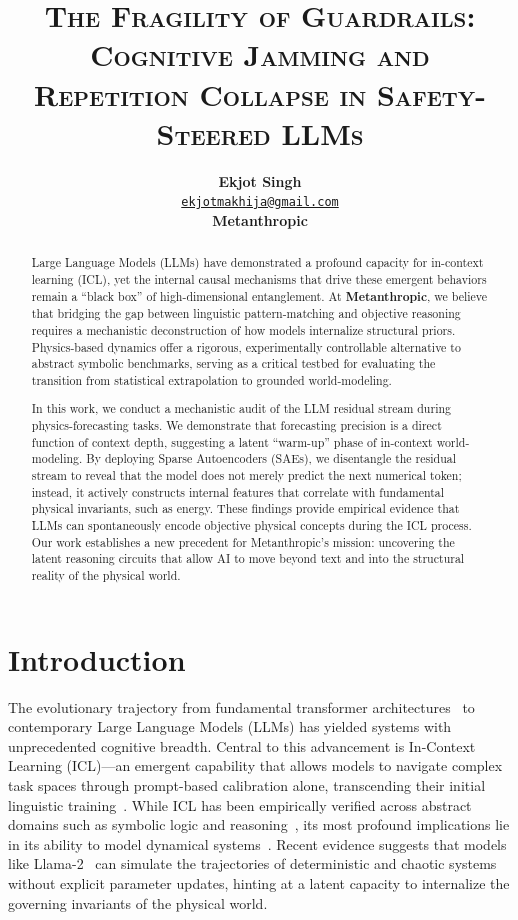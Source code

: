 \documentclass[12pt]{article}
\title{\huge \textbf{\textsc{The Fragility of Guardrails: Cognitive Jamming and Repetition Collapse in Safety-Steered LLMs}}}
\author{
    \parbox{\textwidth}{\centering
        \normalfont\vspace{0.5em}
        {\Large \textbf{Ekjot Singh}} \\
        \href{mailto:ekjotmakhija@gmail.com}{\texttt{ekjotmakhija@gmail.com}} \\[0.5em]
        \textbf{Metanthropic}
    }
}
\date{}
\begin{document}
\maketitle
\thispagestyle{empty}
\newpage
{}

\begin{abstract}
Large Language Models (LLMs) have demonstrated a profound capacity for in-context learning (ICL), yet the internal causal mechanisms that drive these emergent behaviors remain a ``black box'' of high-dimensional entanglement. At \textbf{Metanthropic}, we believe that bridging the gap between linguistic pattern-matching and objective reasoning requires a mechanistic deconstruction of how models internalize structural priors. Physics-based dynamics offer a rigorous, experimentally controllable alternative to abstract symbolic benchmarks, serving as a critical testbed for evaluating the transition from statistical extrapolation to grounded world-modeling.

In this work, we conduct a mechanistic audit of the LLM residual stream during physics-forecasting tasks. We demonstrate that forecasting precision is a direct function of context depth, suggesting a latent ``warm-up'' phase of in-context world-modeling. By deploying Sparse Autoencoders (SAEs), we disentangle the residual stream to reveal that the model does not merely predict the next numerical token; instead, it actively constructs internal features that correlate with fundamental physical invariants, such as energy. These findings provide empirical evidence that LLMs can spontaneously encode objective physical concepts during the ICL process. Our work establishes a new precedent for Metanthropic’s mission: uncovering the latent reasoning circuits that allow AI to move beyond text and into the structural reality of the physical world.
\end{abstract}

\section{Introduction} 
\label{sec:intro}
The evolutionary trajectory from fundamental transformer architectures~\cite{vaswani2017attention} to contemporary Large Language Models (LLMs) has yielded systems with unprecedented cognitive breadth. Central to this advancement is In-Context Learning (ICL)---an emergent capability that allows models to navigate complex task spaces through prompt-based calibration alone, transcending their initial linguistic training~\cite{brown2020language, wei2022emergent, bubeck2023sparks}. While ICL has been empirically verified across abstract domains such as symbolic logic and reasoning~\cite{shi2022language, srivastava2022beyond, webb2023emergent, wei2022chain}, its most profound implications lie in its ability to model dynamical systems~\cite{liu2024llms}. Recent evidence suggests that models like Llama-2~\cite{touvron2023llama} can simulate the trajectories of deterministic and chaotic systems without explicit parameter updates, hinting at a latent capacity to internalize the governing invariants of the physical world.
\end{document}
